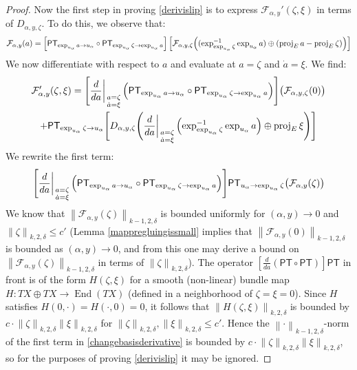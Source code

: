 \documentclass[12pt]{article}
\theoremstyle{definition}
\theoremstyle{remark}
\numberwithin{equation}{subsection}
\newcommand{\F}{\mathcal F}
\newcommand{\PT}{\mathsf{PT}}
\newcommand{\proj}{\operatorname{proj}}
\begin{document}
\begin{proof}
Now the first step in proving \eqref{derivislip} is to express $\F_{\alpha,y}'(\zeta,\xi)$ in terms of $D_{\alpha,y,\zeta}$.  To do this, we observe that:
\begin{equation}
\F_{\alpha,y}(a)=\left[\PT_{\exp_{u_\alpha}a\to u_\alpha}\circ\PT_{\exp_{u_\alpha}\zeta\to\exp_{u_\alpha}a}\right]\left[\F_{\alpha,y,\zeta}\Bigl((\exp_{\exp_{u_\alpha}\zeta}^{-1}\exp_{u_\alpha}a)\oplus(\proj_Ea-\proj_E\zeta)\Bigr)\right]
\end{equation}
We now differentiate with respect to $a$ and evaluate at $a=\zeta$ and $\dot a=\xi$.  We find:
\begin{multline}\label{changebasisderivative}
\F_{\alpha,y}'(\zeta,\xi)=\Biggl[\frac d{da}\biggr|_{\begin{smallmatrix}a=\zeta\cr\dot a=\xi\end{smallmatrix}}\Bigl(\PT_{\exp_{u_\alpha}a\to u_\alpha}\circ\PT_{\exp_{u_\alpha}\zeta\to\exp_{u_\alpha}a}\Bigr)\Biggr]\bigl(\F_{\alpha,y,\zeta}(0)\bigr)\\
+\PT_{\exp_{u_\alpha}\zeta\to u_\alpha}\Biggl[D_{\alpha,y,\zeta}\Biggl(\frac d{da}\biggr|_{\begin{smallmatrix}a=\zeta\cr\dot a=\xi\end{smallmatrix}}\Bigl(\exp_{\exp_{u_\alpha}\zeta}^{-1}\exp_{u_\alpha}a\Bigr)\oplus\proj_E\xi\Biggr)\Biggr]
\end{multline}
We rewrite the first term:
\begin{equation}
\Biggl[\frac d{da}\biggr|_{\begin{smallmatrix}a=\zeta\cr\dot a=\xi\end{smallmatrix}}\Bigl(\PT_{\exp_{u_\alpha}a\to u_\alpha}\circ\PT_{\exp_{u_\alpha}\zeta\to\exp_{u_\alpha}a}\Bigr)\Biggr]\PT_{u_\alpha\to\exp_{u_\alpha}\zeta}\bigl(\F_{\alpha,y}(\zeta)\bigr)
\end{equation}
We know that $\left\|\F_{\alpha,y}(\zeta)\right\|_{k-1,2,\delta}$ is bounded uniformly for $(\alpha,y)\to 0$ and $\left\|\zeta\right\|_{k,2,\delta}\leq c'$ (Lemma \ref{mappregluingissmall} implies that $\left\|\F_{\alpha,y}(0)\right\|_{k-1,2,\delta}$ is bounded as $(\alpha,y)\to 0$, and from this one may derive a bound on $\left\|\F_{\alpha,y}(\zeta)\right\|_{k-1,2,\delta}$ in terms of $\left\|\zeta\right\|_{k,2,\delta}$).  The operator $[\frac d{da}(\PT\circ\PT)]\PT$ in front is of the form $H(\zeta,\xi)$ for a smooth (non-linear) bundle map $H:TX\oplus TX\to\operatorname{End}(TX)$ (defined in a neighborhood of $\zeta=\xi=0$).  Since $H$ satisfies $H(0,\cdot)=H(\cdot,0)=0$, it follows that $\left\|H(\zeta,\xi)\right\|_{k,2,\delta}$ is bounded by $c\cdot\left\|\zeta\right\|_{k,2,\delta}\left\|\xi\right\|_{k,2,\delta}$ for $\left\|\zeta\right\|_{k,2,\delta},\left\|\xi\right\|_{k,2,\delta}\leq c'$.  Hence the $\left\|\cdot\right\|_{k-1,2,\delta}$-norm of the first term in \eqref{changebasisderivative} is bounded by $c\cdot\left\|\zeta\right\|_{k,2,\delta}\left\|\xi\right\|_{k,2,\delta}$, so for the purposes of proving \eqref{derivislip} it may be ignored.


\end{proof}
\end{document}
